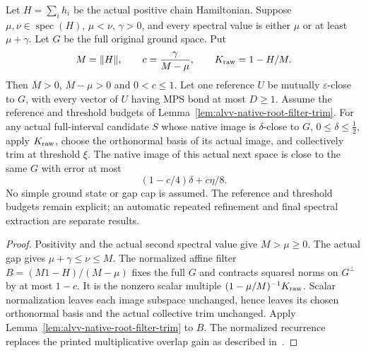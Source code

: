 \begin{lemma}
    \label{lem:physical_dg_native_root_filter_trim}
    \leanok
    Let $H=\sum_i h_i$ be the actual positive chain Hamiltonian. Suppose
    $\mu,\nu\in\operatorname{spec}(H)$, $\mu<\nu$, $\gamma>0$, and every
    spectral value is either $\mu$ or at least $\mu+\gamma$. Let $G$ be
    the full original ground space. Put
    \[
        M=\|H\|,\qquad c=\frac{\gamma}{M-\mu},\qquad
        K_{\rm raw}=1-H/M.
    \]
    Then $M>0$, $M-\mu>0$ and $0<c\le1$.
    Let one reference $U$ be mutually $\varepsilon$-close to $G$, with
    every vector of $U$ having MPS bond at most $D\ge1$. Assume the
    reference and threshold budgets of
    Lemma~\ref{lem:alvv-native-root-filter-trim}.
    For any actual full-interval candidate $S$ whose native image is
    $\delta$-close to $G$, $0\le\delta\le\tfrac12$, apply $K_{\rm raw}$,
    choose the orthonormal basis of its actual image, and collectively
    trim at threshold $\xi$. The native image of this actual next space
    is close to the same $G$ with error at most
    \[
        (1-c/4)\delta+c\eta/8.
    \]
    No simple ground state or gap cap is assumed. The reference and
    threshold budgets remain explicit; an automatic repeated refinement
    and final spectral extraction are separate results.
\end{lemma}
\begin{proof}\leanok
    Positivity and the actual second spectral value give $M>\mu\ge0$.
    The actual gap gives $\mu+\gamma\le\nu\le M$.
    The normalized affine filter
    $B=(M1-H)/(M-\mu)$ fixes the full $G$ and contracts squared norms
    on $G^\perp$ by at most $1-c$. It is the nonzero scalar multiple
    $(1-\mu/M)^{-1}K_{\rm raw}$. Scalar normalization leaves each image
    subspace unchanged, hence leaves its chosen orthonormal basis and
    the actual collective trim unchanged. Apply
    Lemma~\ref{lem:alvv-native-root-filter-trim} to $B$.
    The normalized recurrence replaces the printed multiplicative overlap
    gain as described in~\cite{gap:alvv16_final_filter_gain}.
\end{proof}


